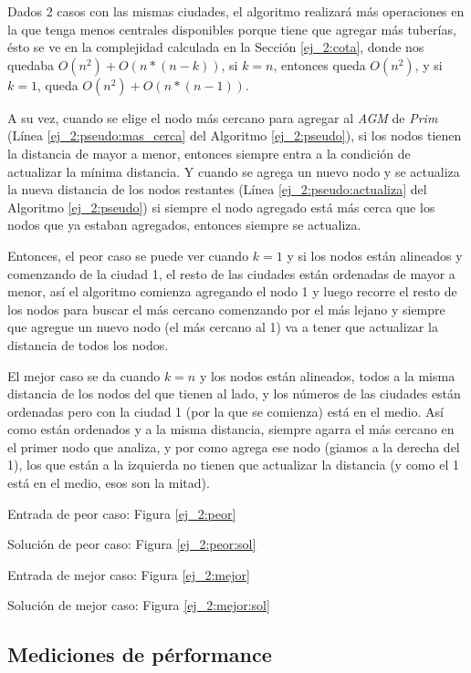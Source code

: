 Dados 2 casos con las mismas ciudades, el algoritmo realizar\'a m\'as operaciones en la que tenga menos centrales disponibles porque tiene que agregar m\'as tuber\'ias, \'esto se ve en la complejidad calculada en la Secci\'on \ref{ej_2:cota}, donde nos quedaba $O(n^2) + O(n*(n - k))$, si $k = n$, entonces queda $O(n^2)$, y si $k = 1$, queda $O(n^2) + O(n*(n - 1))$.

A su vez, cuando se elige el nodo m\'as cercano para agregar al \emph{AGM} de \emph{Prim} (L\'inea \ref{ej_2:pseudo:mas_cerca} del Algoritmo \ref{ej_2:pseudo}), si los nodos tienen la distancia de mayor a menor, entonces siempre entra a la condici\'on de actualizar la m\'inima distancia. Y cuando se agrega un nuevo nodo y se actualiza la nueva distancia de los nodos restantes (L\'inea \ref{ej_2:pseudo:actualiza} del Algoritmo \ref{ej_2:pseudo}) si siempre el nodo agregado est\'a m\'as cerca que los nodos que ya estaban agregados, entonces siempre se actualiza.

Entonces, el peor caso se puede ver cuando $k = 1$ y si los nodos est\'an alineados y comenzando de la ciudad 1, el resto de las ciudades est\'an ordenadas de mayor a menor, as\'i el algoritmo comienza agregando el nodo 1 y luego recorre el resto de los nodos para buscar el m\'as cercano comenzando por el m\'as lejano y siempre que agregue un nuevo nodo (el m\'as cercano al 1) va a tener que actualizar la distancia de todos los nodos.

El mejor caso se da cuando $k = n$ y los nodos est\'an alineados, todos a la misma distancia de los nodos del que tienen al lado, y los n\'umeros de las ciudades est\'an ordenadas pero con la ciudad 1 (por la que se comienza) est\'a en el medio. As\'i como est\'an ordenados y a la misma distancia, siempre agarra el m\'as cercano en el primer nodo que analiza, y por como agrega ese nodo (giamos a la derecha del 1), los que est\'an a la izquierda no tienen que actualizar la distancia (y como el 1 est\'a en el medio, esos son la mitad).

Entrada de peor caso: Figura \ref{ej_2:peor}


Soluci\'on de peor caso: Figura \ref{ej_2:peor:sol}


Entrada de mejor caso: Figura \ref{ej_2:mejor}


Soluci\'on de mejor caso: Figura \ref{ej_2:mejor:sol}


\subsection{Mediciones de p\'erformance} \label{ej_2:performance}

